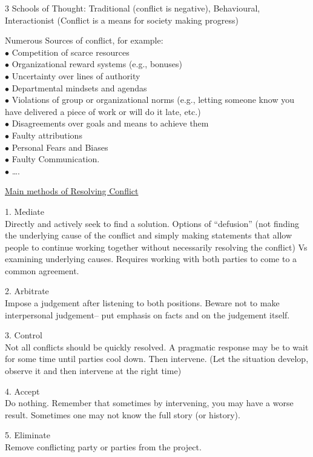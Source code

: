 \documentclass[]{project_plan}
\newcommand{\bulletPoint}{\hspace{-3.1pt}$\bullet$ \hspace{5pt}}
\begin{document}
3 Schools of Thought: Traditional (conflict is negative), Behavioural, Interactionist (Conflict is a means for society making progress)

Numerous Sources of conflict, for example:\\
\bulletPoint Competition of scarce resources\\
\bulletPoint Organizational reward systems (e.g., bonuses)\\
\bulletPoint Uncertainty over lines of authority \\
\bulletPoint Departmental mindsets and agendas \\
\bulletPoint Violations of group or organizational norms (e.g., letting someone know you have delivered a piece of work or will do it late, etc.)\\
\bulletPoint Disagreements over goals and means to achieve them \\
\bulletPoint Faulty attributions\\
\bulletPoint Personal Fears and Biases\\
\bulletPoint Faulty Communication.\\
\bulletPoint ….

\underline{Main methods of Resolving Conflict}

1. Mediate\\
Directly and actively seek to find a solution. Options of “defusion”
(not finding the underlying cause of the conflict and simply making statements
that allow people to continue working together without necessarily resolving
the conflict) Vs
examining underlying causes. Requires working with both parties to come to a
common agreement.

2. Arbitrate\\
Impose a judgement after listening to both positions. Beware not to make
interpersonal judgement– put emphasis on facts and on the judgement itself.

3. Control\\
Not all conflicts should be quickly resolved. A pragmatic response may be to
wait for some time until parties cool down. Then intervene. (Let the situation
develop, observe it and then intervene at the right time)

4. Accept\\
Do nothing. Remember that sometimes by intervening, you may have a worse
result. Sometimes one may not know the full story (or history).

5. Eliminate\\
Remove conflicting party or parties from the project.
\end{document}
